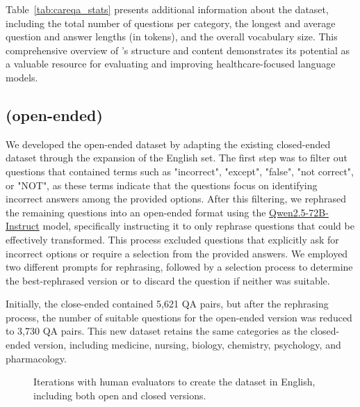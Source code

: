 
Table~\ref{tab:careqa_stats} presents additional information about the dataset, including the total number of questions per category, the longest and average question and answer lengths (in tokens), and the overall vocabulary size. This comprehensive overview of \careqa{}'s structure and content demonstrates its potential as a valuable resource for evaluating and improving healthcare-focused language models.

\subsection{\careqa{} (open-ended)}\label{apx:careqa-open}
We developed the open-ended dataset by adapting the existing closed-ended \careqa{} dataset through the expansion of the English set. The first step was to filter out questions that contained terms such as "incorrect", "except", "false", "not correct", or "NOT", as these terms indicate that the questions focus on identifying incorrect answers among the provided options. After this filtering, we rephrased the remaining questions into an open-ended format using the \href{https://huggingface.co/Qwen/Qwen2.5-72B-Instruct}{Qwen2.5-72B-Instruct} model, specifically instructing it to only rephrase questions that could be effectively transformed. This process excluded questions that explicitly ask for incorrect options or require a selection from the provided answers. We employed two different prompts for rephrasing, followed by a selection process to determine the best-rephrased version or to discard the question if neither was suitable. 

Initially, the close-ended \careqa{} contained 5,621 QA pairs, but after the rephrasing process, the number of suitable questions for the open-ended version was reduced to 3,730 QA pairs. This new dataset retains the same categories as the closed-ended version, including medicine, nursing, biology, chemistry, psychology, and pharmacology.

\begin{figure*}[t]
    \centering
    \vspace{1em} 
    \caption{Iterations with human evaluators to create the \careqa{} dataset in English, including both open and closed versions.}
    \label{fig:iterations}
\end{figure*}

